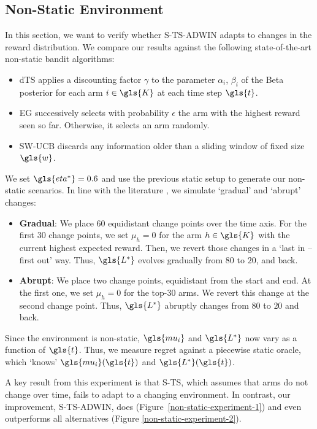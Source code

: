 \subsection{Non-Static Environment}
\label{sec_nonstatenv}

In this section, we want to verify whether \gls{S-TS-ADWIN} adapts to changes in the reward distribution. We compare our results against the following state-of-the-art non-static bandit algorithms: 
\begin{itemize}[noitemsep]
	\item \gls{dTS}  applies a discounting factor $\gamma$ to the parameter $\alpha_i$, $\beta_i$ of the Beta posterior for each arm $i \in \gls{K}$ at each time step $\gls{t}$. 
	\item \gls{EG} successively selects with probability $\epsilon$ the arm with the highest reward seen so far. Otherwise, it selects an arm randomly. \item \gls{SW-UCB} discards any information older than a sliding window of fixed size $\gls{w}$. 
\end{itemize}

We set $\gls{eta^*} = 0.6$ and use the previous static setup to generate our non-static scenarios. In line with the literature \cite{DBLP:journals/csur/GamaZBPB14}, we simulate `gradual' and `abrupt' changes: 
\begin{itemize}[noitemsep]
\item \textbf{Gradual}: We place 60 equidistant change points over the time axis. For the first 30 change points, we set $\mu_h = 0$ for the arm $h \in \gls{K}$ with the current highest expected reward. Then, we revert those changes in a `last in -- first out' way. 
Thus, $\gls{L^*}$ evolves gradually from $80$ to $20$, and back. 
\item \textbf{Abrupt}: We place two change points, equidistant from the start and end. 
At the first one, we set $\mu_h = 0$ for the top-$30$ arms. We revert this change at the second change point. 
Thus, $\gls{L^*}$ abruptly changes from $80$ to $20$ and back.
\end{itemize}

Since the environment is non-static, $\gls{mu_i}$ and $\gls{L^*}$ now vary as a function of $\gls{t}$. Thus, we measure regret against a piecewise static oracle, which `knows' $\gls{mu_i}(\gls{t})$ and $\gls{L^*}(\gls{t})$.

A key result from this experiment is that \gls{S-TS}, which assumes that arms do not change over time, fails to adapt to a changing environment. In contrast, our improvement, \gls{S-TS-ADWIN}, does (Fig\-ure~\ref{non-static-experiment-1}) and even outperforms all alternatives (Figure \ref{non-static-experiment-2}).

